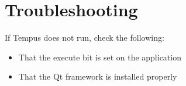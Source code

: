 \section{Troubleshooting}

If Tempus does not run, check the following:
\begin{itemize}
    \item That the execute bit is set on the application
    \item That the Qt framework is installed properly
\end{itemize}

